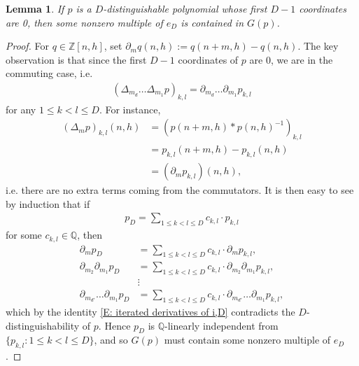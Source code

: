 \documentclass[11pt]{amsart}
\newtheorem{lemma}{Lemma}[section]
\theoremstyle{definition}
\newcommand{\Q}{{\mathbb Q}}
\newcommand{\Z}{{\mathbb Z}}
\newcommand{\inv}{^{-1}}
\newcommand{\1}{{\mathbf{1}}}
\newcommand{\rem}[1]{\left \{ #1 \right \}}
\begin{document}
\begin{lemma}\label{lnh}
If $p$ is a $D$-distinguishable polynomial whose first $D-1$ coordinates are 0, then {some nonzero multiple of} $e_{D}$ is contained in ${G}(p)$.
\end{lemma}
 \begin{proof} 
 For $q\in\Z[n,h]$, set $\partial_mq(n,h):=q(n+m,h)-q(n,h)$.
 The key observation is that since the first $D-1$ coordinates of $p$ are 0, we are in the commuting case, i.e.
 \begin{align}\label{E: iterated derivatives of i,D}
     (\Delta_{m_{d}}\dots\Delta_{m_{1}}p)_{k,l} = \partial_{m_{d}}\dots\partial_{m_{1}}p_{k,l}
 \end{align}
 for any $1\leq k<l\leq D$.
 For instance, 
 \begin{align*}
     (\Delta_m p)_{k,l}(n,h) &= (p(n+m,h)*p(n,h)\inv)_{k,l}\\
     &= p_{k,l}(n+m,h)-p_{k,l}(n,h)\\
     &= (\partial_m p_{k,l})(n,h),
 \end{align*} 
 i.e. there are no extra terms coming from the commutators. It is then easy to see by induction that if 
 \begin{align*}
     p_D = \sum_{1\leq k < l\leq D}c_{k,l} \cdot p_{k,l}
 \end{align*}
 for some $c_{k,l}\in\Q$, then
 \begin{align*}
     \partial_m p_D &= \sum_{1\leq k < l\leq D}c_{k,l} \cdot \partial_m p_{k,l},\\
     \partial_{m_2}\partial_{m_1} p_D &= \sum_{1\leq k < l\leq D}c_{k,l} \cdot \partial_{m_2}\partial_{m_1} p_{k,l},\\
     &\vdots\\
     \partial_{m_{d'}}\dots\partial_{m_{1}}p_D &=\sum_{1\leq k < l\leq D}c_{k,l} \cdot \partial_{m_{d'}}\dots\partial_{m_{1}} p_{k,l},
 \end{align*}
 which by the identity \eqref{E: iterated derivatives of i,D} contradicts the $D$-distinguishability of $p$.
Hence $p_D$ is $\Q$-linearly independent from $\{p_{k,l}\colon 1\leq k<l\leq D\}$, and so ${G}(p)$ must contain {some nonzero multiple of} $e_{D}$.
 \end{proof}
\end{document}

